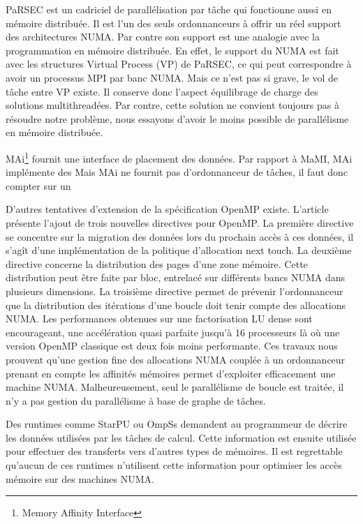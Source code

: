PaRSEC est un cadriciel de parallélisation par tâche qui fonctionne aussi en mémoire distribuée.
%
Il est l'un des seuls ordonnanceurs à offrir un réel support des architectures NUMA.
%
Par contre son support est une analogie avec la programmation en mémoire distribuée.
%
En effet, le support du NUMA est fait avec les structures Virtual Process (VP) de PaRSEC, ce qui peut correspondre à avoir un processus MPI par banc NUMA.
%
Mais ce n'est pas si grave, le vol de tâche entre VP existe.
%
Il conserve donc l'aspect équilibrage de charge des solutions multithreadées.
%
Par contre, cette solution ne convient toujours pas à résoudre notre problème, nous essayons d'avoir le moins possible de parallélisme en mémoire distribuée.



MAi\footnote{Memory Affinity Interface}\cite{mai} fournit une interface de placement des données.
%
Par rapport à MaMI, MAi implémente des
%
Mais MAi ne fournit pas d'ordonnanceur de tâches, il faut donc compter sur un




D'autres tentatives d'extension de la spécification OpenMP existe.
%
L'article~\cite{openmp_numa} présente l'ajout de trois nouvelles directives pour OpenMP.
%
La première directive se concentre sur la migration des données lors du prochain accès à ces données, il s'agît d'une implémentation de la politique d'allocation next touch.
%
La deuxième directive concerne la distribution des pages d'une zone mémoire.
%
Cette distribution peut être faite par bloc, entrelacé sur différents bancs NUMA dans plusieurs dimensions.
%
La troisième directive permet de prévenir l'ordonnanceur que la distribution des itérations d'une boucle doit tenir compte des allocations NUMA.
%
Les performances obtenues sur une factorisation LU dense sont encourageant, une accélération quasi parfaite jusqu'à 16 processeurs là où une version OpenMP classique est deux fois moins performante.
%
Ces travaux nous prouvent qu'une gestion fine des allocations NUMA couplée à un ordonnanceur prenant en compte les affinités mémoires permet d'exploiter efficacement une machine NUMA.
%
Malheureusement, seul le parallélisme de boucle est traitée, il n'y a pas gestion du parallélisme à base de graphe de tâches.



Des runtimes comme StarPU ou OmpSs demandent au programmeur de décrire les données utilisées par les tâches de calcul.
%
Cette information est ensuite utilisée pour effectuer des transferts vers d'autres types de mémoires.
%
Il est regrettable qu'aucun de ces runtimes n'utilisent cette information pour optimiser les accès mémoire sur des machines NUMA.
